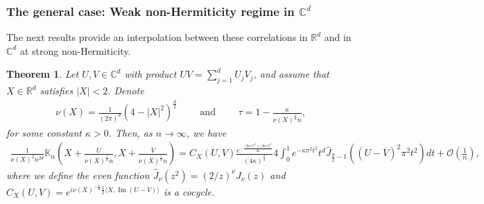\documentclass[%
 jmp,
cp,  %
 amsmath,amsthm,amssymb,%
 reprint,%
onecolumn]{revtex4-2}
\newtheorem{theorem}{Theorem}[section]
\begin{document}
        
        \subsubsection{The general case: Weak non-Hermiticity regime in $\mathbb{C}^d$}

        The next results provide an interpolation between these correlations in $\mathbb{R}^d$ and in $\mathbb{C}^d$ at strong non-Hermiticity.
  
\begin{theorem} \label{thm:weakNonHd_intro}
    Let $U, V\in \mathbb C^d$ with product $UV=\sum_{j=1}^dU_jV_j$, and assume that $X\in\mathbb R^d$ satisfies $\lvert X\rvert < 2$. 
    Denote 
    \begin{align*}
    \nu(X) = \frac{1}{(2\pi)^d} (4-\lvert X \rvert^2)^\frac{d}{2} \qquad\text{ and }\qquad
    \tau = 1 - \frac{\kappa}{\nu(X)^\frac{1}{d} n},
    \end{align*} 
    for some constant $\kappa>0$.  Then, as $n\to\infty$, we have 
    \begin{multline} \label{eq:thm:weakNonHd_intro}
    \frac{1}{\nu(X)^2 n^{2d}} \mathbb K_n\left(X+\frac{U}{\nu(X)^\frac{1}{d} n}, X+\frac{V}{\nu(X)^\frac{1}{d} n}\right)
    = C_X(U,V)
       \frac{e^{-\frac{\lvert \operatorname{Im} U\rvert^2+\lvert \operatorname{Im} V\rvert^2}{2\kappa}}}{(4 \kappa)^\frac{d}{2}} 
   4 \int_0^{1} e^{- \kappa \pi^2 t^2}  t^d \widehat{J}_{\frac{d}{2}-1}\left((U-\overline V)^2 \pi^2 t^2\right) dt
    + \mathcal O\left(\frac{1}{n}\right),
    \end{multline}
    where we define the even function $\widehat{J}_\nu(z^2)=(2/z)^\nu J_\nu(z)$ and 
        $C_X(U,V)= e^{i \nu(X)^{-\frac{1}{d}} \frac{1}{2} \langle X, \operatorname{Im}(U-V)\rangle}$ is a cocycle. 
    \end{theorem}
    
\end{document}
